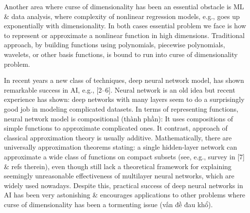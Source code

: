 \documentclass{article}
\begin{document}
\begin{itemize}
	Another area where curse of dimensionality has been an essential obstacle is ML \& data analysis, where complexity of nonlinear regression models, e.g., goes up exponentially with dimensionality. In both cases essential problem we face is how to represent or approximate a nonlinear function in high dimensions. Traditional approach, by building functions using polynomials, piecewise polynomials, wavelets, or other basis functions, is bound to run into curse of dimensionality problem.
	
	In recent years a new class of techniques, deep neural network model, has shown remarkable success in AI, e.g., [2--6]. Neural network is an old idea but recent experience has shown: deep networks with many layers seem to do a surprisingly good job in modeling complicated datasets. In terms of representing functions, neural network model is compositional (thành phần): It uses compositions of simple functions to approximate complicated ones. It contrast, approach of classical approximation theory is usually additive. Mathematically, there are universally approximation theorems stating: a single hidden-layer network can approximate a wide class of functions on compact subsets (see, e.g., survey in [7] \& refs therein), even though still lack a theoretical framework for explaining seemingly unreasonable effectiveness of multilayer neural networks, which are widely used nowadays. Despite this, practical success of deep neural networks in AI has been very astonishing \& encourages applications to other problems where curse of dimensionality has been a tormenting issue (vấn đề đau khổ).
	

\end{itemize}
\end{document}
